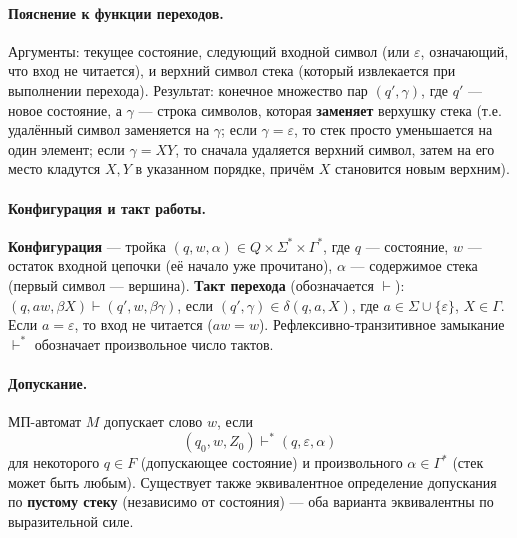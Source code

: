 \documentclass[12pt,a4paper]{article}
\theoremstyle{definition}
\begin{document}
\paragraph{Пояснение к функции переходов.}
Аргументы: текущее состояние, следующий входной символ (или $\varepsilon$, означающий, что вход не читается), и верхний символ стека (который извлекается при выполнении перехода). Результат: конечное множество пар $(q', \gamma)$, где $q'$ — новое состояние, а $\gamma$ — строка символов, которая \textbf{заменяет} верхушку стека (т.е. удалённый символ заменяется на $\gamma$; если $\gamma = \varepsilon$, то стек просто уменьшается на один элемент; если $\gamma = XY$, то сначала удаляется верхний символ, затем на его место кладутся $X, Y$ в указанном порядке, причём $X$ становится новым верхним).

\paragraph{Конфигурация и такт работы.}
\textbf{Конфигурация} — тройка $(q, w, \alpha) \in Q \times \Sigma^* \times \Gamma^*$, где $q$ — состояние, $w$ — остаток входной цепочки (её начало уже прочитано), $\alpha$ — содержимое стека (первый символ — вершина).  
\textbf{Такт перехода} (обозначается $\vdash$): $(q, aw, \beta X) \vdash (q', w, \beta\gamma)$, если $(q', \gamma) \in \delta(q, a, X)$, где $a \in \Sigma \cup \{\varepsilon\}$, $X \in \Gamma$. Если $a = \varepsilon$, то вход не читается ($aw = w$).  
Рефлексивно-транзитивное замыкание $\vdash^*$ обозначает произвольное число тактов.

\paragraph{Допускание.}
МП-автомат $M$ допускает слово $w$, если
\[
(q_0, w, Z_0) \vdash^* (q, \varepsilon, \alpha)
\]
для некоторого $q \in F$ (допускающее состояние) и произвольного $\alpha \in \Gamma^*$ (стек может быть любым).  
Существует также эквивалентное определение допускания по \textbf{пустому стеку} (независимо от состояния) — оба варианта эквивалентны по выразительной силе.
\end{document}
